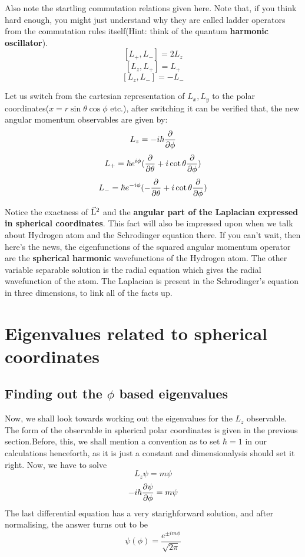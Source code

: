 \documentclass[12pt]{article}
\begin{document}
Also note the startling commutation relations given here. Note that, if you think hard enough, you might just understand why they are called ladder operators from the commutation rules itself(Hint: think of the quantum \textbf{harmonic oscillator}). 
$$[L_+, L_-] = 2L_z$$
$$[L_z, L_+] = L_+$$
$$[L_z, L_-] = -L_-$$
 
Let us switch from the cartesian representation of $L_x, L_y$ to the polar coordinates($x=r\sin\theta\cos\phi$ etc.), after switching it can be verified that, the new angular momentum observables are given by:
$$L_z = -i\hbar\frac{\partial{}}{\partial{\phi}}$$
$$L_+ = \hbar e^{i\phi}(\frac{\partial{}}{\partial{\theta}} + i\cot\theta\frac{\partial{}}{\partial{\phi}})$$
$$L_- = \hbar e^{-i\phi}(-\frac{\partial{}}{\partial{\theta}} + i\cot\theta\frac{\partial{}}{\partial{\phi}})$$

Notice the exactness of \textbf{$\vec{\mathrm{L}}^2$} and the \textbf{angular part of the Laplacian expressed in spherical coordinates}. This fact will also be impressed upon when we talk about Hydrogen atom and the Schrodinger equation there. If you can't wait, then here's the news, the eigenfunctions of the squared angular momentum operator are the \textbf{spherical harmonic} wavefunctions of the Hydrogen atom. The other variable separable solution is the radial equation which gives the radial wavefunction of the atom. The Laplacian is present in the Schrodinger's equation in three dimensions, to link all of the facts up.
\section{Eigenvalues related to spherical coordinates}
\subsection{Finding out the $\phi$ based eigenvalues}
Now, we shall look towards working out the eigenvalues for the $L_z$ observable. The form of the observable in spherical polar coordinates is given in the previous section.Before, this, we shall mention a convention as to set $\hbar = 1$ in our calculations henceforth, as it is just a constant and dimensionalysis should set it right. Now, we have to solve $$L_z\psi = m\psi$$ $$-i\hbar\frac{\partial{\psi}}{\partial{\phi}} = m\psi$$ The last differential equation has a very starighforward solution, and after normalising, the answer turns out to be 
$$\psi(\phi) = \frac{e^{\pm im\phi}}{\sqrt {2\pi}}$$
 
\end{document}
